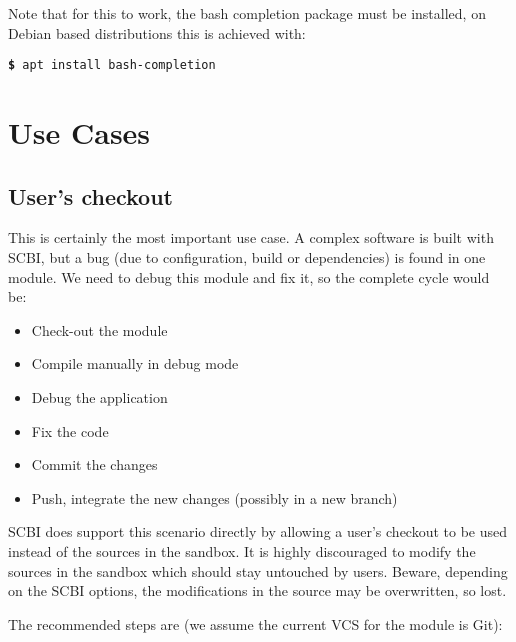 \documentclass[a4paper,12pt,twoside]{article}
\newcommand{\cmd}[1]{\tabto{1cm}\hspace{0.5cm}\texttt{\textbf{\$} #1}}
\let\stdsection\section
\renewcommand\section{\newpage\stdsection}
\begin{document}
Note that for this to work, the bash completion package must be installed, on Debian based distributions this is achieved with:

\cmd{apt install bash-completion}


\section{Use Cases}

\subsection{User's checkout}
\label{userco}

This is certainly the most important use case. A complex software is built with SCBI, but a bug (due to configuration, build or dependencies) is found in one module. We need to debug this module and fix it, so the complete cycle would be:

\begin{itemize}
	\item Check-out the module
	\item Compile manually in debug mode
	\item Debug the application
	\item Fix the code
	\item Commit the changes
	\item Push, integrate the new changes (possibly in a new branch)
\end{itemize}

SCBI does support this scenario directly by allowing a user's checkout to be used instead of the sources in the sandbox. It is highly discouraged to modify the sources in the sandbox which should stay untouched by users. Beware, depending on the SCBI options, the modifications in the source may be overwritten, so lost.

The recommended steps are (we assume the current VCS for the module is Git):
\end{document}
